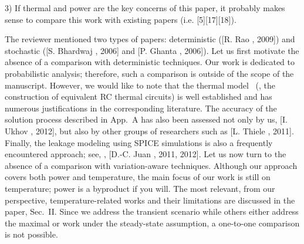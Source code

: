 \begin{reviewer}
3) If thermal and power are the key concerns of this paper, it probably makes sense to compare this work with existing papers (i.e. [5][17][18]).
\end{reviewer}
\begin{authors}
The reviewer mentioned two types of papers: deterministic ([R. Rao \etal, 2009]) and stochastic ([S. Bhardwaj \etal, 2006] and [P. Ghanta \etal, 2006]).
Let us first motivate the absence of a comparison with deterministic techniques.
Our work is dedicated to probabilistic analysis; therefore, such a comparison is outside of the scope of the manuscript.
However, we would like to note that the thermal model \perse\ (\ie, the construction of equivalent RC thermal circuits) is well established and has numerous justifications in the corresponding literature.
The accuracy of the solution process described in App.~A has also been assessed not only by us, [I. Ukhov \etal, 2012], but also by other groups of researchers such as [L. Thiele \etal, 2011].
Finally, the leakage modeling using SPICE simulations is also a frequently encountered approach; see, \eg, [D.-C. Juan \etal, 2011, 2012].
Let us now turn to the absence of a comparison with variation-aware techniques.
Although our approach covers both power and temperature, the main focus of our work is still on temperature; power is a byproduct if you will.
The most relevant, from our perspective, temperature-related works and their limitations are discussed in the paper, Sec.~II.
Since we address the transient scenario while others either address the maximal or work under the steady-state assumption, a one-to-one comparison is not possible.

\end{authors}
